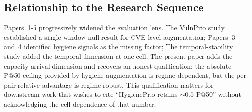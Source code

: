 \subsection{Relationship to the Research Sequence}

Papers~1-5 progressively widened the evaluation lens. The VulnPrio study
established a single-window null result for CVE-level augmentation;
Papers~3 and~4 identified hygiene signals as the missing factor;
The temporal-stability study added the temporal dimension at one cell. The present paper
adds the capacity-arrival dimension and recovers an honest
qualification: the absolute P@50 ceiling provided by hygiene
augmentation is regime-dependent, but the per-pair relative
advantage is regime-robust. This qualification matters for downstream
work that wishes to cite ``HygienePrio retains $\sim 0.5$ P@50''
without acknowledging the cell-dependence of that number.
